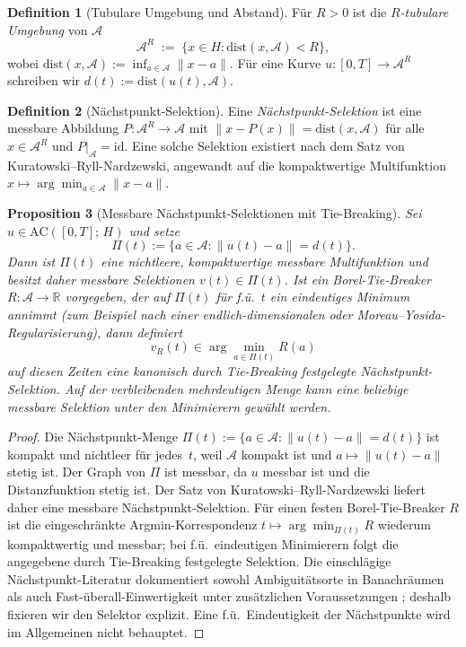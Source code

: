 \documentclass[12pt,a4paper]{article}
\theoremstyle{definition}
\newtheorem{definition}{Definition}[section]
\theoremstyle{plain}
\newtheorem{proposition}[definition]{Proposition}
\theoremstyle{remark}
\newcommand{\dist}{\mathrm{dist}}
\newcommand{\AC}{\mathrm{AC}}
\newcommand{\id}{\mathrm{id}}
\begin{document}
\begin{definition}[Tubulare Umgebung und Abstand]
\label{def:tube}
Für $R > 0$ ist die \emph{$R$-tubulare Umgebung} von $\mathcal{A}$
\[
  \mathcal{A}^R
  \;:=\;
  \{x \in H : \dist(x, \mathcal{A}) < R\},
\]
wobei $\dist(x, \mathcal{A}) := \inf_{a \in \mathcal{A}} \|x - a\|$.
Für eine Kurve $u: [0,T] \to \mathcal{A}^R$ schreiben wir
$d(t) := \dist(u(t), \mathcal{A})$.
\end{definition}

\begin{definition}[Nächstpunkt-Selektion]
\label{def:selection}
Eine \emph{Nächstpunkt-Selektion} ist eine messbare Abbildung
$P: \mathcal{A}^R \to \mathcal{A}$ mit
$\|x - P(x)\| = \dist(x, \mathcal{A})$ für alle
$x \in \mathcal{A}^R$ und $P|_{\mathcal{A}} = \id$.
Eine solche Selektion existiert nach dem Satz von
Kuratowski--Ryll-Nardzewski, angewandt auf die kompaktwertige
Multifunktion
$x \mapsto \arg\min_{a \in \mathcal{A}} \|x-a\|$.
\end{definition}

\begin{proposition}[Messbare Nächstpunkt-Selektionen mit Tie-Breaking]
\label{prop:minimal-selection}
Sei $u \in \AC([0,T];\,H)$ und setze
\[
  \Pi(t) := \{a \in \mathcal{A} : \|u(t)-a\| = d(t)\}.
\]
Dann ist $\Pi(t)$ eine nichtleere, kompaktwertige messbare
Multifunktion und besitzt daher messbare Selektionen
$v(t) \in \Pi(t)$.  Ist ein Borel-Tie-Breaker
$R:\mathcal{A}\to\mathbb{R}$ vorgegeben, der auf $\Pi(t)$ für
f.ü.\ $t$ ein eindeutiges Minimum annimmt (zum Beispiel nach einer
endlich-dimensionalen oder Moreau--Yosida-Regularisierung), dann
definiert
\[
  v_R(t) \in \arg\min_{a\in\Pi(t)} R(a)
\]
auf diesen Zeiten eine kanonisch durch Tie-Breaking festgelegte
Nächstpunkt-Selektion.  Auf der verbleibenden mehrdeutigen Menge
kann eine beliebige messbare Selektion unter den Minimierern
gewählt werden.
\end{proposition}

\begin{proof}
Die Nächstpunkt-Menge $\Pi(t) := \{a \in \mathcal{A} :
\|u(t)-a\| = d(t)\}$ ist kompakt und nichtleer für jedes~$t$,
weil $\mathcal{A}$ kompakt ist und $a\mapsto\|u(t)-a\|$ stetig
ist.  Der Graph von $\Pi$ ist messbar, da $u$ messbar ist und die
Distanzfunktion stetig ist.  Der Satz von Kuratowski--Ryll-Nardzewski
liefert daher eine messbare Nächstpunkt-Selektion.  Für einen festen
Borel-Tie-Breaker $R$ ist die eingeschränkte Argmin-Korrespondenz
$t\mapsto\arg\min_{\Pi(t)}R$ wiederum kompaktwertig und messbar;
bei f.ü.\ eindeutigen Minimierern folgt die angegebene
durch Tie-Breaking festgelegte Selektion.  Die einschlägige Nächstpunkt-Literatur
dokumentiert sowohl Ambiguitätsorte in Banachräumen
\cite{DeBlasiMyjak1993} als auch Fast-überall-Einwertigkeit unter
zusätzlichen Voraussetzungen \cite{Zamfirescu1990}; deshalb fixieren
wir den Selektor explizit.  Eine f.ü.\ Eindeutigkeit der Nächstpunkte
wird im Allgemeinen nicht behauptet.
\end{proof}
\end{document}
